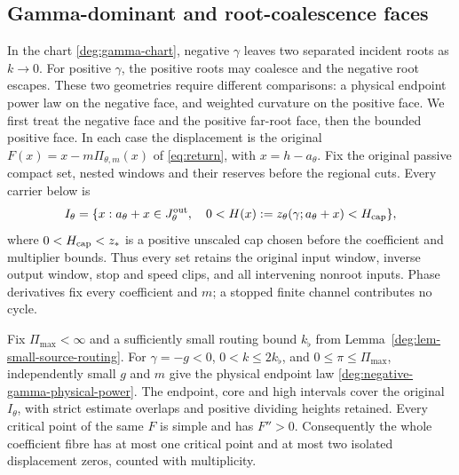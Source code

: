 \subsection{Gamma-dominant and root-coalescence faces}
\label{subsec:deg-gamma-dominant}

In the chart \eqref{deg:gamma-chart}, negative \(\gamma\) leaves two
separated incident roots as \(k\to0\). For positive \(\gamma\), the
positive roots may coalesce and the negative root escapes. These two
geometries require different comparisons: a physical endpoint power law
on the negative face, and weighted curvature on the positive face.
We first treat the negative face and the positive far-root face, then
the bounded positive face. In each case the displacement is the original
\(F(x)=x-m\Pi_{\theta,m}(x)\) of \eqref{eq:return}, with
\(x=h-a_\theta\). Fix the original passive compact set, nested windows
and their reserves before the regional cuts. Every carrier below is
\[
 I_\theta=\{x:a_\theta+x\in J_\theta^{\rm out},\quad
                  0<H(x):=z_\theta(\gamma;a_\theta+x)<H_{\rm cap}\},
\]
where \(0<H_{\rm cap}<z_*\) is a positive unscaled cap chosen before
the coefficient and multiplier bounds. Thus every set retains the original
input window, inverse output window, stop and speed clips, and all
intervening nonroot inputs. Phase derivatives fix every coefficient and
\(m\); a stopped finite channel contributes no cycle.

\begin{proposition}
\label{deg:prop-negative-gamma}
Fix \(\Pi_{\max}<\infty\) and a sufficiently small routing bound
\(k_\flat\) from Lemma~\ref{deg:lem-small-source-routing}.
For \(\gamma=-g<0\), \(0<k\le2k_\flat\), and
\(0\le\pi\le\Pi_{\max}\), independently small \(g\) and \(m\)
give the physical endpoint law \eqref{deg:negative-gamma-physical-power}.
The endpoint, core and high intervals cover the original \(I_\theta\),
with strict estimate overlaps and positive dividing heights retained.
Every critical point of the same \(F\) is simple and has \(F''>0\).
Consequently the whole coefficient fibre has at most one critical point
and at most two isolated displacement zeros, counted with multiplicity.
\end{proposition}

